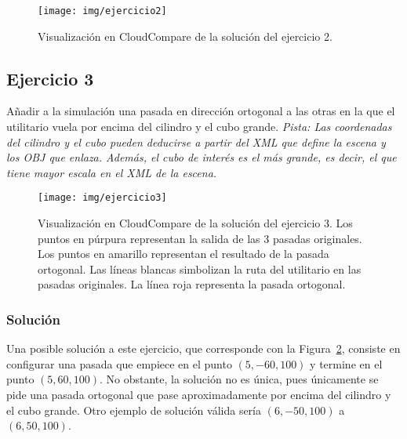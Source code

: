 \documentclass[]{article}
\begin{document}
	\begin{figure}[htb]
		\centering
		\texttt{[image: img/ejercicio2]}
		\caption{Visualización en CloudCompare de la solución del ejercicio 2.}
		\label{fig:ejercicio2}
	\end{figure} 

	
	\pagebreak


	\subsection*{Ejercicio 3}
	Añadir a la simulación una pasada en dirección ortogonal a las otras en la que el utilitario vuela por encima del cilindro y el cubo grande. \it{Pista: Las coordenadas del cilindro y el cubo pueden deducirse a partir del XML que define la escena y los OBJ que enlaza. Además, el cubo de interés es el más grande, es decir, el que tiene mayor escala en el XML de la escena.}
	
	\begin{figure}[htb]
		\centering
		\texttt{[image: img/ejercicio3]}
		\caption{Visualización en CloudCompare de la solución del ejercicio 3. Los puntos en púrpura representan la salida de las 3 pasadas originales. Los puntos en amarillo representan el resultado de la pasada ortogonal. Las líneas blancas simbolizan la ruta del utilitario en las pasadas originales. La línea roja representa la pasada ortogonal.}
		\label{fig:ejercicio3}
	\end{figure} 

	\subsubsection*{Solución}
	Una posible solución a este ejercicio, que corresponde con la Figura~\ref{fig:ejercicio3}, consiste en configurar una pasada que empiece en el punto $(5, -60, 100)$ y termine en el punto $(5, 60, 100)$. No obstante, la solución no es única, pues únicamente se pide una pasada ortogonal que pase aproximadamente por encima del cilindro y el cubo grande. Otro ejemplo de solución válida sería $(6, -50, 100)$ a $(6, 50, 100)$. 
\end{document}
